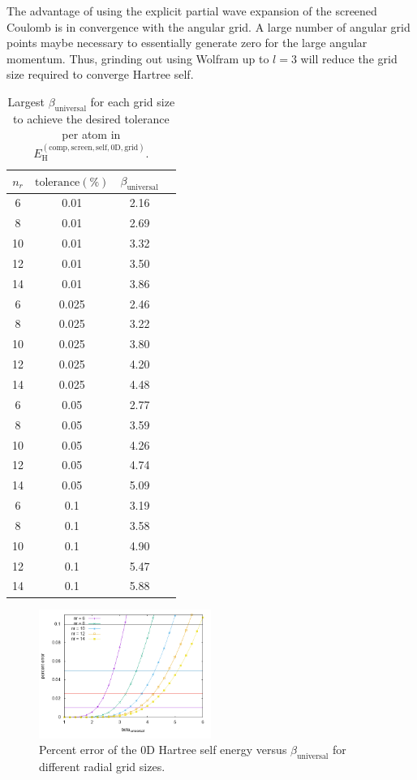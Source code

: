 \documentclass[paper=a4, fontsize=11pt]{article} %
\numberwithin{equation}{section} %
\numberwithin{figure}{section} %
\numberwithin{table}{section} %
\newcommand{\rH}{{\mathrm{H}}}
\newcommand{\rcomp}{{\mathrm{comp}}}
\begin{document}
The advantage of using the explicit partial wave expansion of the screened Coulomb is in convergence with the angular grid. A large number of angular grid points maybe necessary to essentially generate zero for the large angular momentum. Thus, grinding out using Wolfram up to $l=3$ will reduce the grid size required to converge Hartree self.

\begin{table}[h!]
\caption{\label{index} Largest $\beta_{\mathrm{universal}}$ for each grid size to achieve the desired tolerance per atom in $E_{\rH}^{(\rcomp,\mathrm{screen, self, 0D, grid})}$.}
\begin{center}
\begin{tabular}{ c  c  c  c}
  \hline\hline
   $n_r$ & $\mathrm{tolerance} (\%)$ & $\beta_{\mathrm{universal}}$ \\
   \hline
    6 & 0.01 & 2.16\\
    8 & 0.01 & 2.69\\
    10 & 0.01 & 3.32\\
    12 & 0.01 & 3.50\\
    14 & 0.01 & 3.86\\ \hline
    6 & 0.025 & 2.46\\
    8 & 0.025 & 3.22\\
    10 & 0.025 & 3.80\\
    12 & 0.025 & 4.20\\
    14 & 0.025 & 4.48\\ \hline
    6 & 0.05 & 2.77\\
    8 & 0.05 & 3.59\\
    10 & 0.05 & 4.26\\
    12 & 0.05 & 4.74\\
    14 & 0.05 & 5.09\\ \hline
    6 & 0.1 & 3.19\\
    8 & 0.1 & 3.58\\
    10 & 0.1 & 4.90\\
    12 & 0.1 & 5.47\\
    14 & 0.1 & 5.88\\
  \hline\hline
\end{tabular}
\end{center}
\end{table}

\begin{figure}[h!] 
    \centering
    \includegraphics[width=0.5\textwidth]{error}
    \caption{Percent error of the 0D Hartree self energy versus $\beta_{\mathrm{universal}}$ for different radial grid sizes.} 
    \label{fig:error}
\end{figure}
\end{document}

